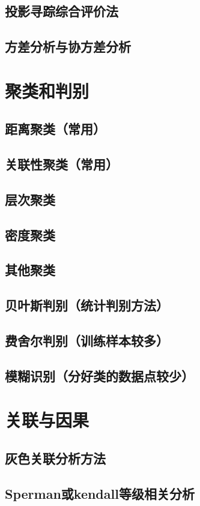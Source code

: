 \documentclass[openany]{progbookcn}
\begin{document}
\section{投影寻踪综合评价法}
\section{方差分析与协方差分析}
\chapter{聚类和判别}
\section{距离聚类（常用）}
\section{关联性聚类（常用）}
\section{层次聚类}
\section{密度聚类}
\section{其他聚类}
\section{贝叶斯判别（统计判别方法）}
\section{费舍尔判别（训练样本较多）}
\section{模糊识别（分好类的数据点较少）}
\chapter{关联与因果}
\section{灰色关联分析方法}
\section{Sperman或kendall等级相关分析}
\end{document}
